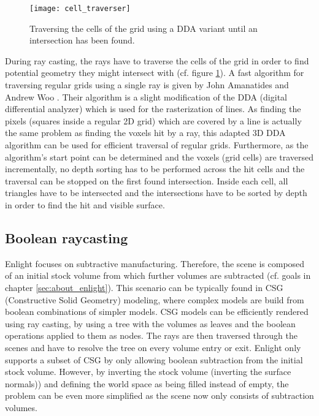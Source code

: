 \begin{figure}
\centering
\texttt{[image: cell\_traverser]}
\caption{Traversing the cells of the grid using a DDA variant until an intersection has been found.}
\label{fig:cell_traverser}
\end{figure}

During ray casting, the rays have to traverse the cells of the grid in order to find potential geometry they might intersect with (cf. figure \ref{fig:cell_traverser}). A fast algorithm for traversing regular grids using a single ray is given by John Amanatides and Andrew Woo \cite{3DDDA}. Their algorithm is a slight modification of the DDA (digital differential analyzer) which is used for the rasterization of lines. As finding the pixels (squares inside a regular 2D grid) which are covered by a line is actually the same problem as finding the voxels hit by a ray, this adapted 3D DDA algorithm can be used for efficient traversal of regular grids. Furthermore, as the algorithm's start point can be determined and the voxels (grid cells) are traversed incrementally, no depth sorting has to be performed across the hit cells and the traversal can be stopped on the first found intersection. Inside each cell, all triangles have to be intersected and the intersections have to be sorted by depth in order to find the hit and visible surface.


\subsection{Boolean raycasting}
\label{sec:boolean_raycasting}

Enlight focuses on subtractive manufacturing. Therefore, the scene is composed of an initial stock volume from which further volumes are subtracted (cf. goals in chapter \ref{sec:about_enlight}). This scenario can be typically found in CSG (Constructive Solid Geometry) modeling, where complex models are build from boolean combinations of simpler models. CSG models can be efficiently rendered using ray casting, by using a tree with the volumes as leaves and the boolean operations applied to them as nodes. The rays are then traversed through the scenes and have to resolve the tree on every volume entry or exit. Enlight only supports a subset of CSG by only allowing boolean subtraction from the initial stock volume. However, by inverting the stock volume (inverting the surface normals)) and defining the world space as being filled instead of empty, the problem can be even more simplified as the scene now only consists of subtraction volumes.

